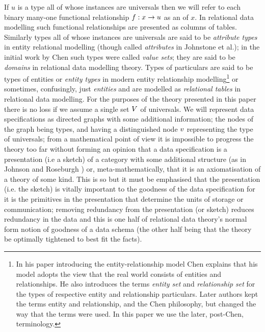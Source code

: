 If $u$ is a type all of whose instances are universals then we will refer to each binary many-one functional relationship $f: x \rightarrow u$ as an  of $x$. In relational data modelling such functional relationships are presented as columns of tables. Similarly types all of whose instances are universals  are said to be \textit{attribute types} in entity relational modelling  (though called \textit{attributes} in Johnstone et al.); in the initial work by Chen such types were called \textit{value sets}; they are said to be \textit{domains} in relational data modelling theory. Types of particulars are said to be types of entities or \textit{entity types} in modern entity relationship modelling\footnote{In  his paper  introducing the entity-relationship model Chen explains that his model adopts the view that the real world consists of entities and relationships. He also introduces the  terms \textit{entity set} and \textit{relationship set} for the types of respective entity and relationship particulars. Later authors kept the terms entity and relationship, and the Chen philosophy, but changed the way that the terms were used. In this paper we use the later, post-Chen, terminology.} or sometimes, confusingly, just \textit{entities}  and are modelled as \textit{relational tables} in relational data modelling. For the purposes of the theory presented in this paper there is no loss if we assume a single set $V$ of universals.  We will represent data specifications as directed graphs with some additional information; the nodes of the graph being types, and having a distinguished node $v$ representing the type of universals; from a mathematical point of view it is impossible to progress the theory too far without forming an opinion that a data specification is a presentation (i.e a sketch) of a category with some additional structure (as in Johnson and Roseburgh \cite{johnson2002REL}) or, meta-mathematically, that it is an axiomatisation of a theory of some kind. This is so but it must be emphasised that the presentation (i.e. the sketch) is vitally important to the goodness of the data specification for it is the primitives in the presentation that determine the units of storage or communication; removing redundancy from the presentation (or sketch) reduces redundancy in the data and this is one half of relational data theory's  normal form notion of goodness of a data schema (the other half being that the theory be optimally tightened to best fit the facts). 


